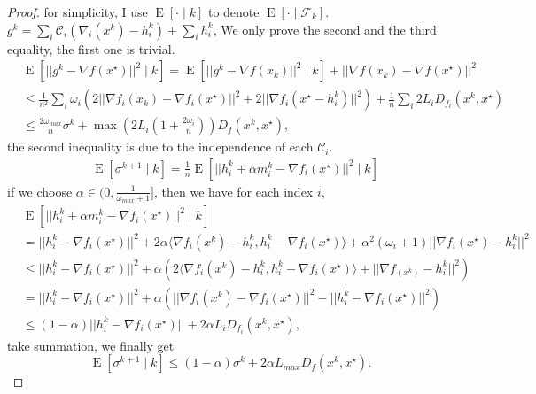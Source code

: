 \documentclass[12pt,a4paper]{article}
\DeclareMathOperator{\E}{\mathrm{E}}
\begin{document}
	\begin{proof}
		for simplicity, I use $\E\left[\cdot\mid k\right]$ to denote $\E\left[\cdot\mid \mathcal{F}_k\right]$.$g^k=\sum_i \mathcal{C}_i(\nabla_i(x^k)-h_i^k)+\sum_i h^k_i$,
		We only prove the second and the third equality, the first one is trivial.
		\begin{equation}
			\begin{aligned}
			&\E\left[||g^k-\nabla f(x^{\star})||^2\mid k\right]=\E\left[||g^k-\nabla f(x_k)||^2\mid k\right]+||\nabla f(x_k)-\nabla f(x^{\star})||^2\\
					&\leq\frac{1}{n^2}\sum_i\omega_i(2||\nabla f_i(x_k)-\nabla f_i(x^{\star})||^2+2||\nabla f_i(x^{\star}-h_i^k)||^2)+\frac{1}{n}\sum_i2L_i D_{f_i}(x^k,x^{\star})\\
					&\leq \frac{2\omega_{max}}{n}\sigma^k+\max(2L_i(1+\frac{2\omega_i}{n}))D_f(x^k,x^{\star}),
			\end{aligned}
		\end{equation}
	the second inequality is due to the independence of each $\mathcal{C}_i$.
	\begin{equation}
		\begin{aligned}
			&\E\left[\sigma^{k+1}\mid k\right]=\frac{1}{n}\E\left[||h_i^k+\alpha m_i^k-\nabla f_i(x^{\star})||^2\mid k\right]
		\end{aligned}
	\end{equation}
	if we choose $\alpha\in (0,\frac{1}{\omega_{max}+1}]$, then we have for each index $i$,
	\begin{equation}
		\begin{aligned}
			&\E\left[||h_i^k+\alpha m_i^k-\nabla f_i(x^{\star})||^2\mid k\right]\\
			&= ||h^k_i-\nabla f_i(x^{\star})||^2+2\alpha \langle \nabla f_i(x^k)-h_i^k,h^k_i-\nabla f_i(x^{\star})\rangle+\alpha^2(\omega_i+1)||\nabla f_i(x^{\star})-h_i^k||^2\\
			&\leq ||h_i^k-\nabla f_i(x^{\star})||^2+\alpha(2\langle \nabla f_i(x^k)-h^k_i,h^k_i-\nabla f_i(x^{\star})\rangle+||\nabla f_(x^k)-h^k_i||^2)\\
			&=||h^k_i-\nabla f_i(x^{\star})||^2+\alpha(||\nabla f_i(x^k)-\nabla f_i(x^{\star})||^2-||h^k_i-\nabla f_i(x^{\star})||^2)\\
			&\leq (1-\alpha)||h_i^k-\nabla f_i(x^{\star})||+2\alpha L_iD_{f_i}(x^k,x^{\star}),
		\end{aligned}
	\end{equation}
	take summation, we finally get
	\begin{equation}
		\E\left[\sigma^{k+1}\mid k\right]\leq (1-\alpha)\sigma^k+2\alpha L_{max}D_f(x^k,x^{\star}).
	\end{equation}
	\end{proof}
\end{document}
